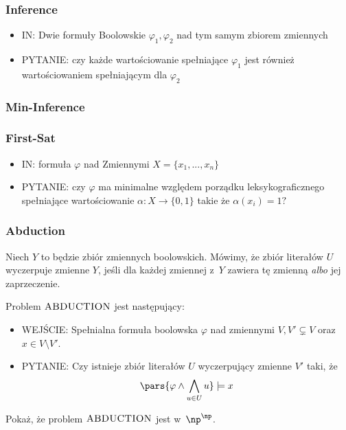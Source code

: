 \subsubsection{Inference}
    \begin{itemize}
        \item IN: Dwie formuły Boolowskie \(\varphi_1, \varphi_2\) nad tym samym zbiorem zmiennych
        \item PYTANIE: czy każde wartościowanie spełniające \(\varphi_1\) jest również
wartościowaniem spełniającym dla \(\varphi_2\)
    \end{itemize}



\subsubsection{Min-Inference}

\subsubsection{First-Sat}
\begin{itemize}
    \item IN: formuła \(\varphi\) nad Zmiennymi \(X = \{x_1, ..., x_n\} \)
    \item PYTANIE: czy \(\varphi\) ma minimalne względem porządku leksykograficznego spełniające wartościowanie \(\alpha : X \rightarrow \{0, 1\}\) takie że \( \alpha(x_i) = 1?\) 
\end{itemize}

\subsubsection{Abduction}
\begin{definition}
    Niech \(Y\) to będzie zbiór zmiennych boolowskich. Mówimy, że zbiór literałów \(U\) wyczerpuje zmienne \(Y\), jeśli dla każdej zmiennej z~\(Y\) zawiera tę zmienną \emph{albo} jej zaprzeczenie.
\end{definition}
Problem \(\textsc{ABDUCTION}\) jest następujący:
\begin{itemize}
    \item WEJŚCIE: Spełnialna formuła boolowska \(\varphi\) nad zmiennymi \(V, V' \subsetneq V\) oraz \(x \in V \setminus V'\).
    \item PYTANIE: Czy istnieje zbiór literałów \(U\) wyczerpujący zmienne \(V'\) taki, że
        \[
            \pars{\varphi \land \bigwedge_{u \in U}u} \models x
        \]
\end{itemize}
Pokaż, że problem \(\textsc{ABDUCTION}\) jest w~\(\np^\np\).


